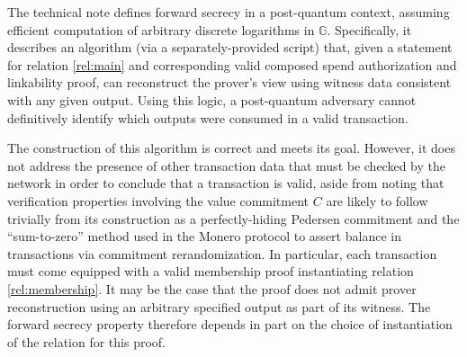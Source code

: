 \documentclass{article}
\theoremstyle{definition}
\newcommand{\GG}{\mathbb{G}}
\begin{document}
The technical note defines forward secrecy in a post-quantum context, assuming efficient computation of arbitrary discrete logarithms in $\GG$.
Specifically, it describes an algorithm (via a separately-provided script) that, given a statement for relation \ref{rel:main} and corresponding valid composed spend authorization and linkability proof, can reconstruct the prover's view using witness data consistent with any given output.
Using this logic, a post-quantum adversary cannot definitively identify which outputs were consumed in a valid transaction.

The construction of this algorithm is correct and meets its goal.
However, it does not address the presence of other transaction data that must be checked by the network in order to conclude that a transaction is valid, aside from noting that verification properties involving the value commitment $C$ are likely to follow trivially from its construction as a perfectly-hiding Pedersen commitment and the ``sum-to-zero'' method used in the Monero protocol to assert balance in transactions via commitment rerandomization.
In particular, each transaction must come equipped with a valid membership proof instantiating relation \ref{rel:membership}.
It may be the case that the proof does not admit prover reconstruction using an arbitrary specified output as part of its witness.
The forward secrecy property therefore depends in part on the choice of instantiation of the relation for this proof.




\end{document}

